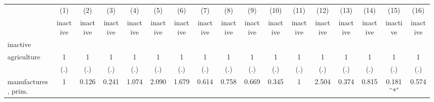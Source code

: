 {
\def\sym#1{\ifmmode^{#1}\else\(^{#1}\)\fi}
\begin{tabular}{l*{16}{c}}
\hline\hline
                    &\multicolumn{1}{c}{(1)}&\multicolumn{1}{c}{(2)}&\multicolumn{1}{c}{(3)}&\multicolumn{1}{c}{(4)}&\multicolumn{1}{c}{(5)}&\multicolumn{1}{c}{(6)}&\multicolumn{1}{c}{(7)}&\multicolumn{1}{c}{(8)}&\multicolumn{1}{c}{(9)}&\multicolumn{1}{c}{(10)}&\multicolumn{1}{c}{(11)}&\multicolumn{1}{c}{(12)}&\multicolumn{1}{c}{(13)}&\multicolumn{1}{c}{(14)}&\multicolumn{1}{c}{(15)}&\multicolumn{1}{c}{(16)}\\
                    &\multicolumn{1}{c}{inactive}&\multicolumn{1}{c}{inactive}&\multicolumn{1}{c}{inactive}&\multicolumn{1}{c}{inactive}&\multicolumn{1}{c}{inactive}&\multicolumn{1}{c}{inactive}&\multicolumn{1}{c}{inactive}&\multicolumn{1}{c}{inactive}&\multicolumn{1}{c}{inactive}&\multicolumn{1}{c}{inactive}&\multicolumn{1}{c}{inactive}&\multicolumn{1}{c}{inactive}&\multicolumn{1}{c}{inactive}&\multicolumn{1}{c}{inactive}&\multicolumn{1}{c}{inactive}&\multicolumn{1}{c}{inactive}\\
\hline
inactive            &                     &                     &                     &                     &                     &                     &                     &                     &                     &                     &                     &                     &                     &                     &                     &                     \\
agriculture         &           1         &           1         &           1         &           1         &           1         &           1         &           1         &           1         &           1         &           1         &           1         &           1         &           1         &           1         &           1         &           1         \\
                    &         (.)         &         (.)         &         (.)         &         (.)         &         (.)         &         (.)         &         (.)         &         (.)         &         (.)         &         (.)         &         (.)         &         (.)         &         (.)         &         (.)         &         (.)         &         (.)         \\
[1em]
manufactures, prim. &           1         &       0.126         &       0.241         &       1.074         &       2.090         &       1.679         &       0.614         &       0.758         &       0.669         &       0.345         &           1         &       2.504         &       0.374         &       0.815         &       0.181\sym{*}  &       0.574         \\

\end{tabular}}
